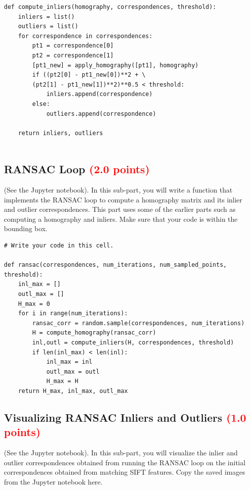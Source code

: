 \documentclass[answers]{exam}
\newcommand{\mypoints}[1]{\textcolor{red}{(#1 points)}}
\begin{document}
\begin{solution}
\begin{verbatim}
def compute_inliers(homography, correspondences, threshold):
    inliers = list()
    outliers = list()
    for correspondence in correspondences:
        pt1 = correspondence[0]
        pt2 = correspondence[1]
        [pt1_new] = apply_homography([pt1], homography)
        if ((pt2[0] - pt1_new[0])**2 + \ 
        (pt2[1] - pt1_new[1])**2)**0.5 < threshold:
            inliers.append(correspondence)
        else:
            outliers.append(correspondence)
            
    return inliers, outliers
    
\end{verbatim}
\end{solution}

\subsection{RANSAC Loop \mypoints{2.0}}
(See the Jupyter notebook). In this sub-part, you will write a function that implements the RANSAC loop to compute a homography matrix and its inlier and outlier correspondences. This part uses some of the earlier parts such as computing a homography and inliers. Make sure that your code is within the bounding box.

\begin{solution}
\begin{verbatim}
# Write your code in this cell.

def ransac(correspondences, num_iterations, num_sampled_points, threshold):
    inl_max = []
    outl_max = []
    H_max = 0
    for i in range(num_iterations):
        ransac_corr = random.sample(correspondences, num_iterations)
        H = compute_homography(ransac_corr)
        inl,outl = compute_inliers(H, correspondences, threshold)
        if len(inl_max) < len(inl):
            inl_max = inl
            outl_max = outl
            H_max = H
    return H_max, inl_max, outl_max

\end{verbatim}
\end{solution}

\subsection{Visualizing RANSAC Inliers and Outliers \mypoints{1.0}}
(See the Jupyter notebook). In this sub-part, you will visualize the inlier and outlier correspondences obtained from running the RANSAC loop on the initial correspondences obtained from matching SIFT features. Copy the saved images from the Jupyter notebook here.
\end{document}
